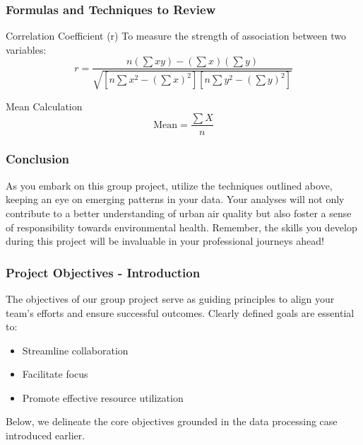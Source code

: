 \documentclass[aspectratio=169]{beamer}
\begin{document}
\begin{frame}[fragile]
    \frametitle{Formulas and Techniques to Review}
    \begin{block}{Correlation Coefficient (r)}
        To measure the strength of association between two variables:
        \[
        r = \frac{n(\sum xy) - (\sum x)(\sum y)}{\sqrt{[n\sum x^2 - (\sum x)^2][n\sum y^2 - (\sum y)^2]}}
        \]
    \end{block}

    \begin{block}{Mean Calculation}
        \[
        \text{Mean} = \frac{\sum X}{n}
        \]
    \end{block}
\end{frame}

\begin{frame}[fragile]
    \frametitle{Conclusion}
    As you embark on this group project, utilize the techniques outlined above, keeping an eye on emerging patterns in your data. Your analyses will not only contribute to a better understanding of urban air quality but also foster a sense of responsibility towards environmental health. Remember, the skills you develop during this project will be invaluable in your professional journeys ahead!
\end{frame}

\begin{frame}[fragile]
    \frametitle{Project Objectives - Introduction}
    The objectives of our group project serve as guiding principles to align your team’s efforts and ensure successful outcomes. Clearly defined goals are essential to:
    \begin{itemize}
        \item Streamline collaboration
        \item Facilitate focus
        \item Promote effective resource utilization
    \end{itemize}
    Below, we delineate the core objectives grounded in the data processing case introduced earlier.
\end{frame}
\end{document}
